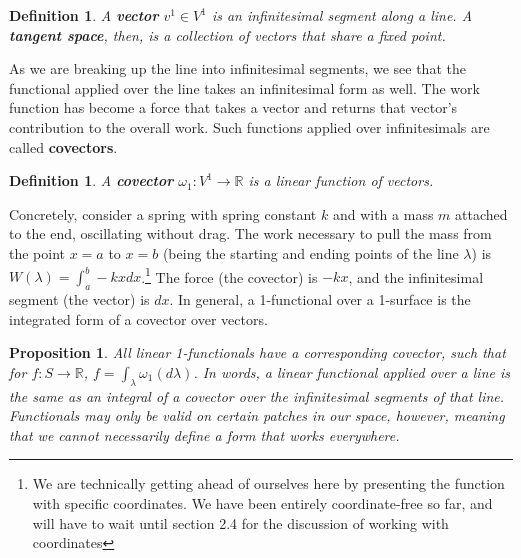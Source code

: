 \documentclass{book}
\newtheorem{defn}[equation]{Definition}
\newtheorem{prop}[equation]{Proposition}
\begin{document}
\begin{defn}
	A \textbf{vector} $v^1 \in V^1$ is an infinitesimal segment along a line. A \textbf{tangent space}, then, is a collection of vectors that share a fixed point. 
\end{defn}

As we are breaking up the line into infinitesimal segments, we see that the functional applied over the line takes an infinitesimal form as well. The work function has become a force that takes a vector and returns that vector's contribution to the overall work. Such functions applied over infinitesimals are called \textbf{covectors}. 

\begin{defn}
	A \textbf{covector} $\omega_1 : V^1 \to \mathbb{R}$ is a linear function of vectors. 
\end{defn}

Concretely, consider a spring with spring constant $k$ and with a mass $m$ attached to the end, oscillating without drag. The work necessary to pull the mass from the point $x = a$ to $x = b$ (being the starting and ending points of the line $\lambda$) is $W(\lambda) = \int_a^b -kx dx$.\footnote{We are technically getting ahead of ourselves here by presenting the function with specific coordinates. We have been entirely coordinate-free so far, and will have to wait until section 2.4 for the discussion of working with coordinates} The force (the covector) is $-kx$, and the infinitesimal segment (the vector) is $dx$. In general, a 1-functional over a 1-surface is the integrated form of a covector over vectors.










\begin{center}
\end{center}

\begin{prop}
	All linear 1-functionals have a corresponding covector, such that for $f : S \to \mathbb{R}$, $f = \int_{\lambda} \omega_1(d\lambda)$. In words, a linear functional applied over a line is the same as an integral of a covector over the infinitesimal segments of that line. Functionals may only be valid on certain patches in our space, however, meaning that we cannot necessarily define a form that works everywhere. 
\end{prop}
\end{document}
